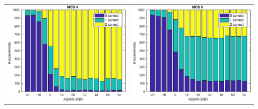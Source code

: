 \documentclass[accentcolor=tud8b,colorbacktitle]{tudbeamer}
\begin{document}
\begin{frame}
\begin{tabular}{cc}
		\includegraphics[height=0.52\textheight]{../../gfx/plots/awgn-mcs4} &
		\includegraphics[height=0.52\textheight]{../../gfx/plots/awgn-mcs6} \\
	\end{tabular}
\end{frame}
\end{document}
